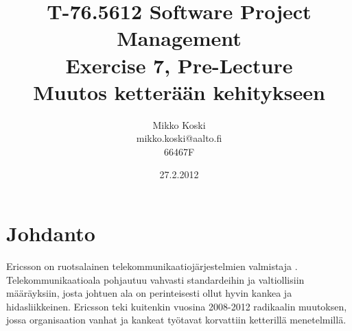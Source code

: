 \documentclass[a4paper]{article}
\begin{document}
\title{\small T-76.5612 Software Project Management \\ Exercise 7, Pre-Lecture \\ \huge Muutos ketterään kehitykseen}
\date{27.2.2012}
\author{Mikko Koski \\ mikko.koski@aalto.fi \\ 66467F}
\maketitle

\normalsize

\section{Johdanto}

Ericsson on ruotsalainen telekommunikaatiojärjestelmien valmistaja \citep{wikiericsson}. Telekommunikaatioala pohjautuu vahvasti standardeihin ja valtiollisiin määräyksiin, josta johtuen ala on perinteisesti ollut hyvin kankea ja hidasliikkeinen. Ericsson teki kuitenkin vuosina 2008-2012 radikaalin muutoksen, jossa organisaation vanhat ja kankeat työtavat korvattiin ketterillä menetelmillä. \citep{mikkonen2011}





\citep{hallikainen2012}

\citep{seikola}

\citep{mikkonen2011}



\end{document}
